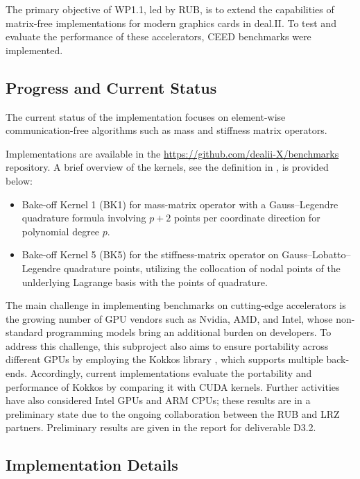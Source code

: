 \documentclass[a4paper,12pt]{article}
\begin{document}
The primary objective of WP1.1, led by RUB, is to extend the capabilities of matrix-free implementations for modern graphics cards in deal.II. To test and evaluate the performance of these accelerators, CEED benchmarks \citep{Kolev2021} were implemented. 

\subsection{Progress and Current Status}

The current status of the implementation focuses on element-wise communication-free algorithms such as mass and stiffness matrix operators. 

Implementations are available in the \url{https://github.com/dealii-X/benchmarks} repository. A brief overview of the kernels, see the definition in \cite{Fischer2020}, is provided below:
\begin{itemize}
\item Bake-off Kernel 1 (BK1) for mass-matrix operator with a Gauss--Legendre quadrature formula involving $p+2$ points per coordinate direction for polynomial degree $p$.
\item Bake-off Kernel 5 (BK5) for the stiffness-matrix operator on Gauss--Lobatto--Legendre quadrature points, utilizing the collocation of nodal points of the unlderlying Lagrange basis with the points of quadrature.
\end{itemize}

The main challenge in implementing benchmarks on cutting-edge accelerators is the growing number of GPU vendors such as Nvidia, AMD, and Intel, whose non-standard programming models bring an additional burden on developers. To address this challenge, this subproject also aims to ensure portability across different GPUs by employing the Kokkos library \citep{Trott2022}, which supports multiple back-ends. Accordingly, current implementations evaluate the portability and performance of Kokkos by comparing it with CUDA kernels.
Further activities have also considered Intel GPUs and ARM CPUs; these results
are in a preliminary state due to the ongoing collaboration between the RUB
and LRZ partners. Preliminary results are given in the report for deliverable
D3.2.


\subsection{Implementation Details}
\end{document}
